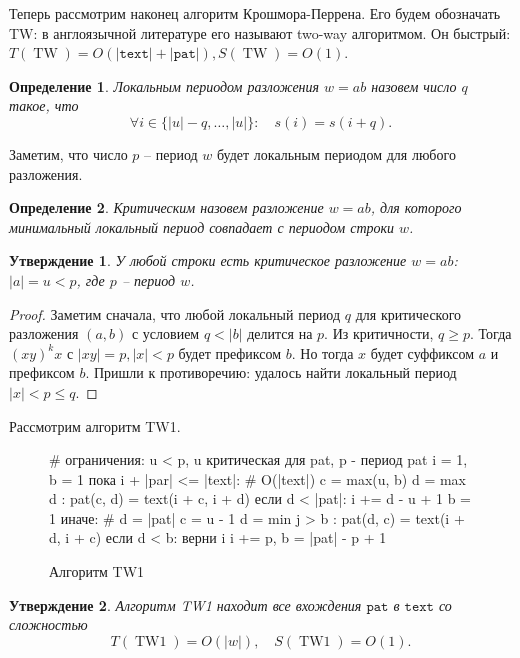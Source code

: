 \documentclass[letterpaper, 12pt]{article}
\newtheorem{stm}{Утверждение}
\newtheorem{definition}{Определение}
\newcommand{\textm}{\texttt{text}}
\newcommand{\patm}{\texttt{pat}}
\newenvironment{figurem}[1][]
  {\begin{figure}[t]
  \caption{#1}
  \centering
  }
  {
  \end{figure}
  }
\begin{document}
Теперь рассмотрим наконец алгоритм Крошмора-Перрена. Его будем обозначать TW:
в англоязычной литературе его называют two-way алгоритмом. Он быстрый:
$T(\operatorname{TW}) = O(|\textm| + |\patm|), S(\operatorname{TW}) = O(1)$.

\begin{definition}
  Локальным периодом разложения $w = ab$ назовем число $q$ такое, что
  $$\forall i \in \{|u| - q, \ldots, |u|\}: \quad s(i) = s(i + q).$$
\end{definition}

Заметим, что число $p$ -- период $w$ будет локальным периодом для любого
разложения.

\begin{definition}
  Критическим назовем разложение $w = ab$, для которого минимальный локальный
  период совпадает с периодом строки $w$.
\end{definition}

\begin{stm}
  У любой строки есть критическое разложение $w = ab$: $|a| = u < p$, где $p$
  -- период $w$. 
\end{stm}
\begin{proof}

Заметим сначала, что любой локальный период $q$ для критического разложения 
$(a,b)$ с условием $q < |b|$ делится на $p$. Из критичности, $q \ge p$. Тогда 
$(xy)^kx$ с $|xy| = p, |x| < p$ будет префиксом $b$. Но тогда $x$ будет 
суффиксом $a$ и префиксом $b$. Пришли к противоречию: удалось найти локальный
период $|x| < p \le q$.
  
\end{proof}

Рассмотрим алгоритм TW1.

\begin{figurem}[Алгоритм TW1]
\begin{verbm}
  # ограничения: u < p, u критическая для pat, p - период pat
  i = 1, b = 1
  пока i + |par| <= |text|:  # O(|text|)
    c = max(u, b)
    d = max { d : pat(c, d) = text(i + c, i + d) }
    если d < |pat|:
      i += d - u + 1
      b = 1
    иначе:  # d = |pat|
      c = u - 1
      d = min { j > b : pat(d, c) = text(i + d, i + c) }
      если d < b:
        верни i
      i += p, b = |pat| - p + 1
\end{verbm}
\end{figurem}

\begin{stm}
  Алгоритм TW1 находит все вхождения $\patm$ в $\textm$ со сложностью
  $$T(\operatorname{TW1}) = O(|w|), \quad S(\operatorname{TW1}) = O(1).$$
\end{stm}
\end{document}
